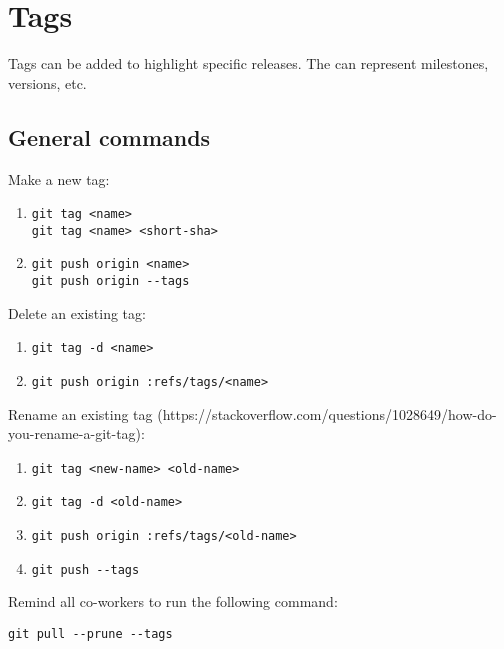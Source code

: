 \documentclass{article}
\begin{document}
\section{Tags}
Tags can be added to highlight specific releases. The can represent milestones, versions, etc.

\subsection{General commands}

Make a new tag:
\begin{enumerate}
    \item
    \begin{verbatim}
git tag <name>
git tag <name> <short-sha>
    \end{verbatim}
    \item
    \begin{verbatim}
git push origin <name>
git push origin --tags
    \end{verbatim}
\end{enumerate}

Delete an existing tag:
\begin{enumerate}
    \item 
    \begin{verbatim}
git tag -d <name>
    \end{verbatim}
    \item
    \begin{verbatim}
git push origin :refs/tags/<name>
    \end{verbatim}
\end{enumerate}

Rename an existing tag (https://stackoverflow.com/questions/1028649/how-do-you-rename-a-git-tag):
\begin{enumerate}
    \item 
    \begin{verbatim}
git tag <new-name> <old-name>
    \end{verbatim}
    \item
    \begin{verbatim}
git tag -d <old-name>
    \end{verbatim}
    \item
    \begin{verbatim}
git push origin :refs/tags/<old-name>
    \end{verbatim}
    \item
    \begin{verbatim}
git push --tags
    \end{verbatim}
\end{enumerate}

Remind all co-workers to run the following command:
\begin{verbatim}
git pull --prune --tags
\end{verbatim}
\end{document}
